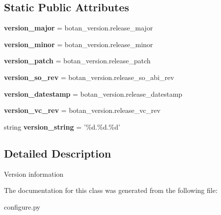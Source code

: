 \subsection*{Static Public Attributes}
\begin{DoxyCompactItemize}
\item 
\hypertarget{classconfigure_1_1BuildConfigurationInformation_a9625b3ae2e69e4783d4d1819cf819c91}{{\bfseries version\-\_\-major} = botan\-\_\-version.\-release\-\_\-major}\label{classconfigure_1_1BuildConfigurationInformation_a9625b3ae2e69e4783d4d1819cf819c91}

\item 
\hypertarget{classconfigure_1_1BuildConfigurationInformation_a42fe192c8e61fce5ee630f663d7fb413}{{\bfseries version\-\_\-minor} = botan\-\_\-version.\-release\-\_\-minor}\label{classconfigure_1_1BuildConfigurationInformation_a42fe192c8e61fce5ee630f663d7fb413}

\item 
\hypertarget{classconfigure_1_1BuildConfigurationInformation_a3eb2ea5ccca79264725ce58f68c0e44f}{{\bfseries version\-\_\-patch} = botan\-\_\-version.\-release\-\_\-patch}\label{classconfigure_1_1BuildConfigurationInformation_a3eb2ea5ccca79264725ce58f68c0e44f}

\item 
\hypertarget{classconfigure_1_1BuildConfigurationInformation_a0d79a6c05452a4a0d9361135d4817b86}{{\bfseries version\-\_\-so\-\_\-rev} = botan\-\_\-version.\-release\-\_\-so\-\_\-abi\-\_\-rev}\label{classconfigure_1_1BuildConfigurationInformation_a0d79a6c05452a4a0d9361135d4817b86}

\item 
\hypertarget{classconfigure_1_1BuildConfigurationInformation_a56e98631806d39d8d179bbc087a8e46a}{{\bfseries version\-\_\-datestamp} = botan\-\_\-version.\-release\-\_\-datestamp}\label{classconfigure_1_1BuildConfigurationInformation_a56e98631806d39d8d179bbc087a8e46a}

\item 
\hypertarget{classconfigure_1_1BuildConfigurationInformation_a56fd45b01eb4558e10321055c2294448}{{\bfseries version\-\_\-vc\-\_\-rev} = botan\-\_\-version.\-release\-\_\-vc\-\_\-rev}\label{classconfigure_1_1BuildConfigurationInformation_a56fd45b01eb4558e10321055c2294448}

\item 
\hypertarget{classconfigure_1_1BuildConfigurationInformation_a8aeea1babbf46161d42d63381db38241}{string {\bfseries version\-\_\-string} = '\%d.\%d.\%d'}\label{classconfigure_1_1BuildConfigurationInformation_a8aeea1babbf46161d42d63381db38241}

\end{DoxyCompactItemize}


\subsection{Detailed Description}
\begin{DoxyVerb}Version information
\end{DoxyVerb}
 

The documentation for this class was generated from the following file\-:\begin{DoxyCompactItemize}
\item 
configure.\-py\end{DoxyCompactItemize}
